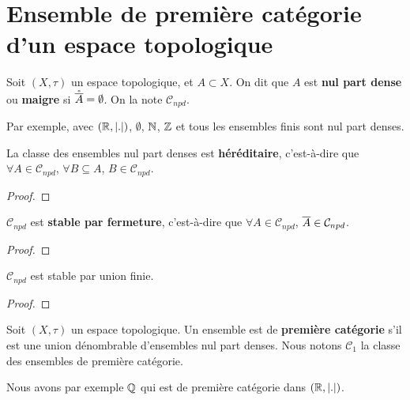 \chapter{Ensemble de première catégorie d'un espace topologique}

\begin{definition}
	Soit $(X, \tau)$ un espace topologique, et $A \subset X$. On dit que $A$ est
	\textbf{nul part dense} ou \textbf{maigre} si $\mathring{\overline{A}} =
	\emptyset$. On la note $\mathcal{C}_{npd}$.
\end{definition}

Par exemple, avec $(\mathbb{R}, |.|)$, $\emptyset$, $\mathbb{N}$, $\mathbb{Z}$ et tous
les ensembles finis sont nul part denses.

\begin{proposition}
	La classe des ensembles nul part denses est \textbf{héréditaire},
	c'est-à-dire que $\forall A \in \mathcal{C}_{npd}$, $\forall B \subseteq A$,
	$B \in \mathcal{C}_{npd}$.
\end{proposition}

\begin{proof}
	
\end{proof}

\begin{proposition}
	$\mathcal{C}_{npd}$ est \textbf{stable par fermeture}, c'est-à-dire que
	$\forall A \in \mathcal{C}_{npd}$, $\overline{A} \in \mathcal{C}_{npd}$.
\end{proposition}

\begin{proof}
	
\end{proof}

\begin{proposition}
	$\mathcal{C}_{npd}$ est stable par union finie.
\end{proposition}

\begin{proof}
	
\end{proof}

\begin{definition}
	Soit $(X, \tau)$ un espace topologique.
	Un ensemble est de \textbf{première catégorie} s'il est une union
	dénombrable d'ensembles nul part denses. Nous notons $\mathcal{C}_{1}$ la
	classe des ensembles de première catégorie.
\end{definition}

Nous avons par exemple $\mathbb{Q}$ qui est de première catégorie dans $(\mathbb{R},
|.|)$.

